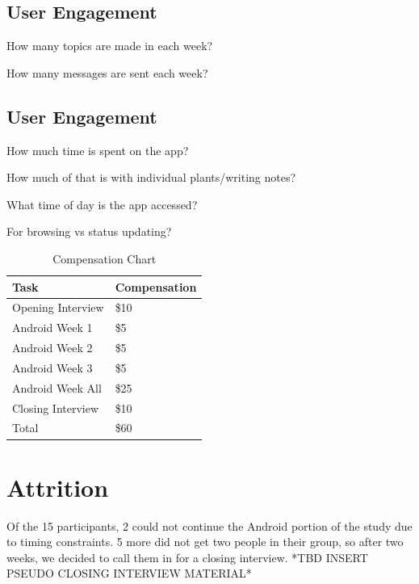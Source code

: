     \subsection{User Engagement}

      \item How many topics are made in each week?
      \item How many messages are sent each week?

    \subsection{User Engagement}
      \item How much time is spent on the app?
      \item How much of that is with individual plants/writing notes?
      \item What time of day is the app accessed?
      \item For browsing vs status updating?

  \begin{table}[h]
  \centering
  \caption{Compensation Chart}
  \label{table:compensation}
  \begin{tabular}{ l l }
  Task & Compensation \\
  \hline
  Opening Interview & \$10 \\[5pt]
  Android Week 1 & \$5 \\[5pt]
  Android Week 2 & \$5 \\[5pt]
  Android Week 3 & \$5 \\[5pt]
  Android Week All & \$25 \\[5pt]
  Closing Interview & \$10 \\[5pt]
  \hline
  Total & \$60
  \end{tabular}
  \end{table}

  \section{Attrition}
  \label{sec:Android}
  Of the 15 participants, 2 could not continue the Android portion
  of the study due to timing constraints.
  5 more did not get two people in their group,
  so after two weeks,
  we decided to call them in for a closing interview.
  *TBD INSERT PSEUDO CLOSING INTERVIEW MATERIAL*

